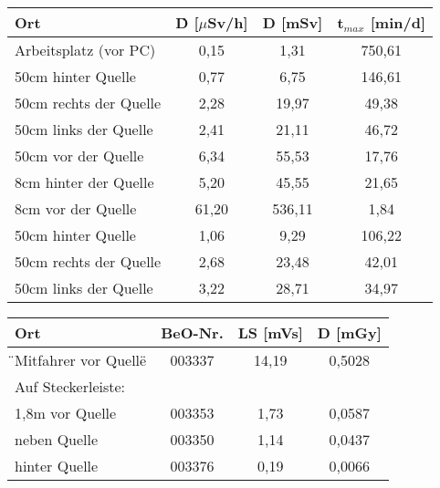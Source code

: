 	
\minipanf
	\begin{center}
		\begin{tabular}{l|c|c|c}
			\textbf{Ort} & \textbf{\.D} [$\mu$Sv/h] & \textbf{D} [mSv]  & \textbf{t$_{max}$} [min/d]\\ 
			\hline  Arbeitsplatz (vor PC) & 0,15  &   1,31 & 750,61\\ 
				50cm hinter Quelle    & 0,77  &   6,75 & 146,61\\ 				
				50cm rechts der Quelle& 2,28  &  19,97 &  49,38\\ 
				50cm links der Quelle & 2,41  &  21,11 &  46,72\\ 
				50cm vor der Quelle   & 6,34  &  55,53 &  17,76\\ 
				8cm hinter der Quelle & 5,20  &  45,55 &  21,65\\ 
				8cm vor der Quelle    & 61,20 & 536,11 &   1,84\\
			\hline  50cm hinter Quelle    & 1,06  &   9,29 & 106,22\\
				50cm rechts der Quelle& 2,68  &  23,48 &  42,01\\ 
				50cm links der Quelle & 3,22  &  28,71 &  34,97\\
		\end{tabular}	
		\label{dft:Arbeitsplatz}
		\vspace{8mm}
		\begin{tabular}{l|c|c|c}
			\textbf{Ort} & \textbf{BeO-Nr.} & \textbf{LS} [mVs] & \textbf{D} [mGy] \\
			\hline  \"{}Mitfahrer vor Quelle\" & 003337 & 14,19 & 0,5028 \\								Auf Steckerleiste:                &        &       &        \\
			 \hspace{3mm} 1,8m vor Quelle     & 003353 & 1,73  & 0,0587 \\
			 \hspace{3mm} neben Quelle        & 003350 & 1,14  & 0,0437 \\
			 \hspace{3mm} hinter Quelle       & 003376 & 0,19  & 0,0066 \\
		\end{tabular}
		\label{dft:Raum}
                \vspace{8mm}
	\end{center}
\minipend
	
